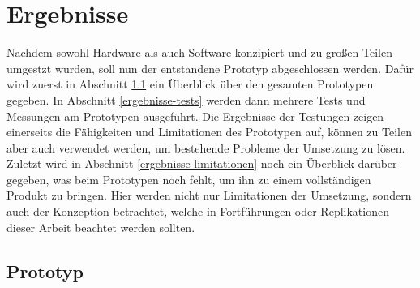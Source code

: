 

\chapter{Ergebnisse} \label{ergebnisse}
\nocite{*}

Nachdem sowohl Hardware als auch Software konzipiert und zu großen Teilen umgestzt wurden, soll nun der entstandene Prototyp abgeschlossen werden.
Dafür wird zuerst in Abschnitt \ref{ergebnisse-prototyp} ein Überblick über den gesamten Prototypen gegeben.
In Abschnitt \ref{ergebnisse-tests} werden dann mehrere Tests und Messungen am Prototypen ausgeführt.
Die Ergebnisse der Testungen zeigen einerseits die Fähigkeiten und Limitationen des Prototypen auf, können zu Teilen aber auch verwendet werden, um bestehende Probleme der Umsetzung zu lösen.
Zuletzt wird in Abschnitt \ref{ergebnisse-limitationen} noch ein Überblick darüber gegeben, was beim Prototypen noch fehlt, um ihn zu einem vollständigen Produkt zu bringen. %
Hier werden nicht nur Limitationen der Umsetzung, sondern auch der Konzeption betrachtet, welche in Fortführungen oder Replikationen dieser Arbeit beachtet werden sollten.



\section{Prototyp} \label{ergebnisse-prototyp}

